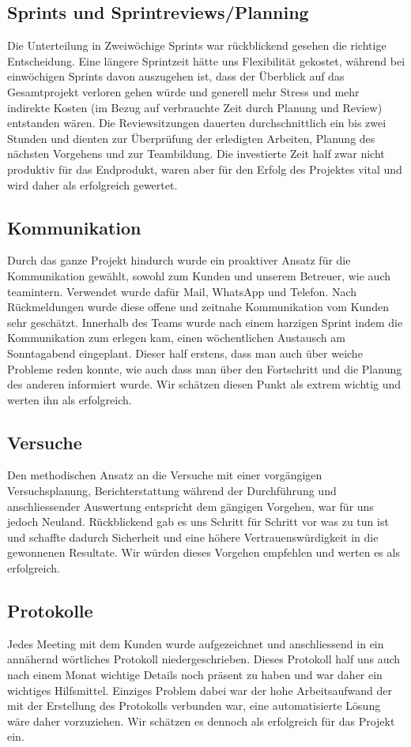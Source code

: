 \subsection{Sprints und Sprintreviews/Planning}
Die Unterteilung in Zweiwöchige Sprints war rückblickend gesehen die richtige Entscheidung. Eine längere Sprintzeit hätte uns Flexibilität gekostet, während bei einwöchigen Sprints davon auszugehen ist, dass der Überblick auf das Gesamtprojekt verloren gehen würde und generell mehr Stress und mehr indirekte Kosten (im Bezug auf verbrauchte Zeit durch Planung und Review) entstanden wären. Die Reviewsitzungen dauerten durchschnittlich ein bis zwei Stunden und dienten zur Überprüfung der erledigten Arbeiten, Planung des nächsten Vorgehens und zur Teambildung. Die investierte Zeit half zwar nicht produktiv für das Endprodukt, waren aber für den Erfolg des Projektes vital und wird daher als erfolgreich gewertet.

\subsection{Kommunikation}
Durch das ganze Projekt hindurch wurde ein proaktiver Ansatz für die Kommunikation gewählt, sowohl zum Kunden und unserem Betreuer, wie auch teamintern. Verwendet wurde dafür Mail, WhatsApp und Telefon. Nach Rückmeldungen wurde diese offene und zeitnahe Kommunikation vom Kunden sehr geschätzt. Innerhalb des Teams wurde nach einem harzigen Sprint indem die Kommunikation zum erlegen kam, einen wöchentlichen Austausch am Sonntagabend eingeplant. Dieser half erstens, dass man auch über weiche Probleme reden konnte, wie auch dass man über den Fortschritt und die Planung des anderen informiert wurde. Wir schätzen diesen Punkt als extrem wichtig und werten ihn als erfolgreich.

\subsection{Versuche}
Den methodischen Ansatz an die Versuche mit einer vorgängigen Versuchsplanung, Berichterstattung während der Durchführung und anschliessender Auswertung entspricht dem gängigen Vorgehen, war für uns jedoch Neuland. Rückblickend gab es uns Schritt für Schritt vor was zu tun ist und schaffte dadurch Sicherheit und eine höhere Vertrauenswürdigkeit in die gewonnenen Resultate. Wir würden dieses Vorgehen empfehlen und werten es als erfolgreich.

\subsection{Protokolle}
Jedes Meeting mit dem Kunden wurde aufgezeichnet und anschliessend in ein annähernd wörtliches Protokoll niedergeschrieben. Dieses Protokoll half uns auch nach einem Monat wichtige Details noch präsent zu haben und war daher ein wichtiges Hilfsmittel. Einziges Problem dabei war der hohe Arbeitsaufwand der mit der Erstellung des Protokolls verbunden war, eine automatisierte Lösung wäre daher vorzuziehen. Wir schätzen es dennoch als erfolgreich für das Projekt ein.
